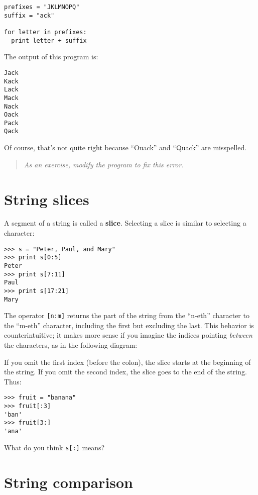 \beforeverb
\begin{verbatim}
prefixes = "JKLMNOPQ"
suffix = "ack"

for letter in prefixes:
  print letter + suffix
\end{verbatim}
\afterverb
%
The output of this program is:

\beforeverb
\begin{verbatim}
Jack
Kack
Lack
Mack
Nack
Oack
Pack
Qack
\end{verbatim}
\afterverb
%
Of course, that's not quite right because ``Ouack'' and
``Quack'' are misspelled.

\begin{quote}
{\em As an exercise, modify the program to fix this error.}
\end{quote}


\section{String slices}
\label{slice}

A segment of a string is called a 
{\bf slice}.  Selecting a slice is similar to
selecting a character:

\beforeverb
\begin{verbatim}
>>> s = "Peter, Paul, and Mary"
>>> print s[0:5]
Peter
>>> print s[7:11]
Paul
>>> print s[17:21]
Mary
\end{verbatim}
\afterverb
%
The operator {\tt [n:m]} returns the part of the string from the 
``n-eth'' character to the ``m-eth'' character, including the first but
excluding the last.  This behavior is counterintuitive; it makes
more sense if you imagine the indices pointing {\em between} the
characters, as in the following diagram:

\beforefig
\centerline{}
\afterfig

If you omit the first index (before the colon), the slice starts at the
beginning of the string.  If you omit the second index, the slice goes to the
end of the string.  Thus:

\beforeverb
\begin{verbatim}
>>> fruit = "banana"
>>> fruit[:3]
'ban'
>>> fruit[3:]
'ana'
\end{verbatim}
\afterverb
%
What do you think {\tt s[:]} means?


\section{String comparison}

